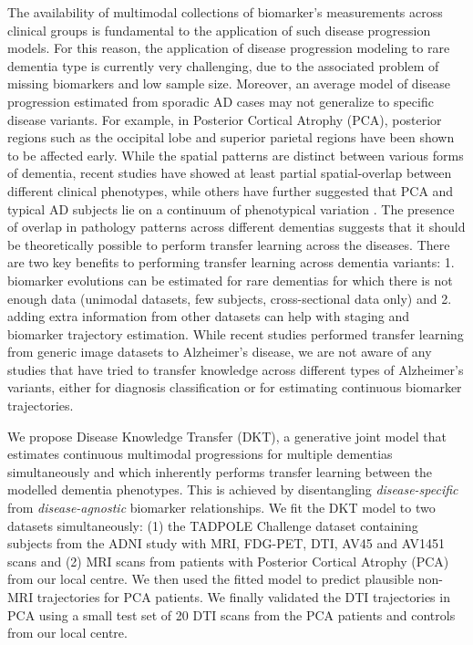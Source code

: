 \documentclass{llncs}
\begin{document}
The availability of multimodal collections of biomarker's measurements across clinical groups is fundamental to the application of such disease progression models. For this reason, the application of disease progression modeling to rare dementia type is currently very challenging, due to the associated problem of missing biomarkers and low sample size.  Moreover, an average model of disease progression estimated from sporadic AD cases may not generalize to specific disease variants. For example, in Posterior Cortical Atrophy (PCA), posterior regions such as the occipital lobe and superior parietal regions have been shown to be affected early. While the spatial patterns are distinct between various forms of dementia, recent studies \cite{Ossenkoppele2014atrophy} have showed at least partial spatial-overlap between different clinical phenotypes, while others have further suggested that PCA and typical AD subjects lie on a continuum of phenotypical variation \cite{crutch2012posterior}. The presence of overlap in pathology patterns across different dementias suggests that it should be theoretically possible to perform transfer learning across the diseases. There are two key benefits to performing transfer learning across dementia variants: 1. biomarker evolutions can be estimated for rare dementias for which there is not enough data (unimodal datasets, few subjects, cross-sectional data only) and 2. adding extra information from other datasets can help with staging and biomarker trajectory estimation. While recent studies \cite{hon2017towards} performed transfer learning from generic image datasets to Alzheimer's disease, we are not aware of any studies that have tried to transfer knowledge across different types of Alzheimer's variants, either for diagnosis classification or for estimating continuous biomarker trajectories.


We propose Disease Knowledge Transfer (DKT), a generative joint model that estimates continuous multimodal progressions for multiple dementias simultaneously and which inherently performs transfer learning between the modelled dementia phenotypes. This is achieved by disentangling \emph{disease-specific} from \emph{disease-agnostic} biomarker relationships. We fit the DKT model to two datasets simultaneously: (1) the TADPOLE Challenge dataset containing subjects from the ADNI study with MRI, FDG-PET, DTI, AV45 and AV1451 scans and (2) MRI scans from patients with Posterior Cortical Atrophy (PCA) from our local centre. We then used the fitted model to predict plausible non-MRI trajectories for PCA patients. We finally validated the DTI trajectories in PCA using a small test set of 20 DTI scans from the PCA patients and controls from our local centre.
\end{document}
